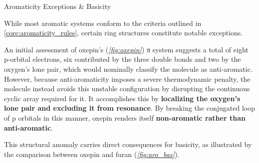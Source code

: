     \begin{core}{Aromaticity Exceptions \& Basicity}

      While most aromatic systems conform to the criteria outlined in \autoref{core:aromaticity_rules}, certain ring structures constitute notable exceptions.

      \vspace{-0.4cm}

      An initial assessment of oxepin's (\textit{\autoref{fig:oxepin}}) π system suggests a total of eight p-orbital electrons, six contributed by the three double bonds and two by the oxygen's lone pair, which would nominally classify the molecule as anti-aromatic. However, because anti-aromaticity imposes a severe thermodynamic penalty, the molecule instead avoids this unstable configuration by disrupting the continuous cyclic array required for it. It accomplishes this by \textbf{localizing the oxygen's lone pair and excluding it from resonance}. By breaking the conjugated loop of p orbitals in this manner, oxepin renders itself \textbf{non-aromatic rather than anti-aromatic}.


      This structural anomaly carries direct consequences for basicity, as illustrated by the comparison between oxepin and furan (\textit{\autoref{fig:aro_bas}}).

      \begin{itemize}


\end{itemize}
\end{core}
